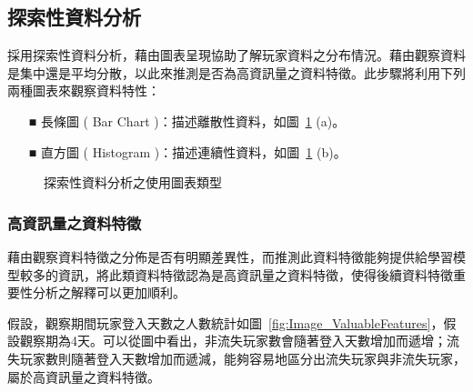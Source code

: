 \subsection{探索性資料分析}
採用探索性資料分析，藉由圖表呈現協助了解玩家資料之分布情況。藉由觀察資料是集中還是平均分散，以此來推測是否為高資訊量之資料特徵。此步驟將利用下列兩種圖表來觀察資料特性：

\begin{itemize}
  \item [■] 長條圖 ( Bar Chart )：描述離散性資料，如圖~\ref{fig:Image_EDADiagrams} (a)。
  \item [■] 直方圖 ( Histogram )：描述連續性資料，如圖~\ref{fig:Image_EDADiagrams} (b)。
\end{itemize}

\begin{figure}[!htb]
  \centering
  \caption[探索性資料分析之使用圖表類型]{探索性資料分析之使用圖表類型}
  \label{fig:Image_EDADiagrams}
\end{figure}

\subsubsection{高資訊量之資料特徵}
\label{subsubsec:ValuableFeatures}

藉由觀察資料特徵之分佈是否有明顯差異性，而推測此資料特徵能夠提供給學習模型較多的資訊，將此類資料特徵認為是高資訊量之資料特徵，使得後續資料特徵重要性分析之解釋可以更加順利。

假設，觀察期間玩家登入天數之人數統計如圖~\ref{fig:Image_ValuableFeatures}，假設觀察期為4天。可以從圖中看出，非流失玩家數會隨著登入天數增加而遞增；流失玩家數則隨著登入天數增加而遞減，能夠容易地區分出流失玩家與非流失玩家，屬於高資訊量之資料特徵。


